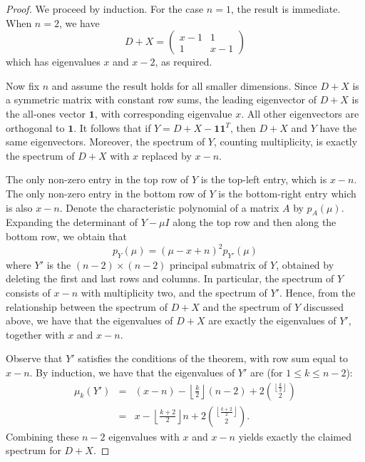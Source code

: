 \begin{proof}
 We proceed by induction.  For the case $n=1$, the result is immediate.  
 When $n=2$, we have
  \[ D+X = \begin{pmatrix}
 x-1 & 1 \\
 1 & x-1
\end{pmatrix} \]
which has eigenvalues $x$ and $x-2$, as required.

Now fix $n$ and assume the result holds for all smaller dimensions. 
Since $D+X$ is a symmetric matrix with constant row sums, the leading 
eigenvector of $D+X$ is
the all-ones vector $\textbf{1}$, with corresponding eigenvalue 
$x$.  All other eigenvectors are orthogonal to $\textbf{1}$.
It follows that if $Y = D+X - \textbf{1}\textbf{1}^T$,
then $D+X$ and $Y$ have the same eigenvectors.   Moreover, 
the spectrum of $Y$, counting multiplicity, is exactly the
spectrum of $D+X$ with $x$ replaced by $x-n$.


The only non-zero entry in the top row of $Y$ is the top-left entry, which
is $x-n$.  The only non-zero entry in the bottom row of $Y$ is the bottom-right entry which is also $x-n$.
Denote the characteristic polynomial of a matrix $A$ by $p_A(\mu)$.  Expanding the determinant of $Y - \mu I$
along the top row and then along the bottom row, we obtain that 
 \[ p_Y(\mu) = (\mu - x + n)^2 p_{Y'}(\mu) \]
where $Y'$ is the $(n-2) \times (n-2)$ principal submatrix of $Y$, obtained
by deleting the first and last rows and columns.  In particular, the spectrum
of $Y$ consists of $x-n$ with multiplicity two, and the spectrum of $Y'$.
Hence, from the relationship between the spectrum of $D+X$ and the spectrum of
$Y$ discussed above, we  have that the eigenvalues of $D+X$ are exactly
the eigenvalues of $Y'$, together with $x$ and $x-n$.


Observe that $Y'$ satisfies the conditions of the theorem, with row sum equal 
to $x-n$.  By induction, we have that the eigenvalues of $Y'$ are (for $1 \leq k \leq n-2$):
\begin{eqnarray*}
  \mu_k(Y') & = & (x-n) - \left\lfloor \frac{k}{2} \right\rfloor (n-2) + 2 \binom{\left\lfloor \frac{k}{2} \right\rfloor}{2} \\
  & = & x - \left\lfloor \frac{k+2}{2} \right\rfloor n + 2 \binom{\left\lfloor \frac{k+2}{2} \right\rfloor}{2} .
\end{eqnarray*}
Combining these $n-2$ eigenvalues with $x$ and $x-n$ yields exactly the claimed spectrum for $D+X$.
\end{proof}

